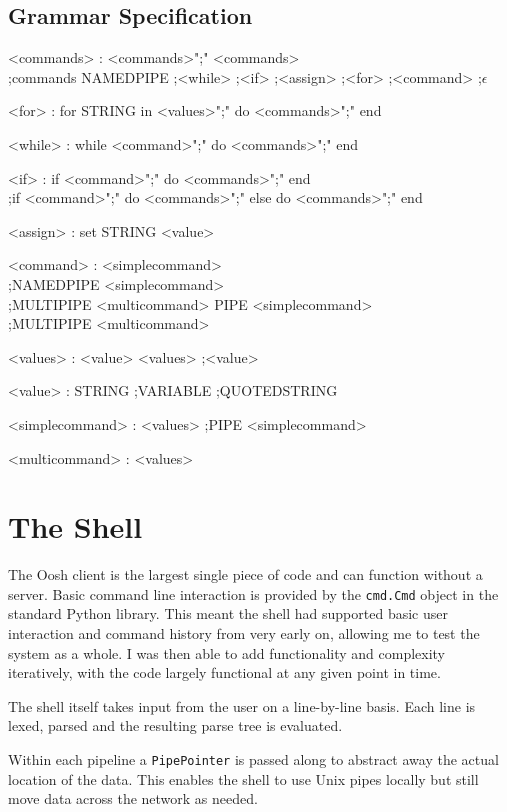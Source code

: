 \documentclass[12pt,twoside,notitlepage]{report}
\begin{document}
\subsection{Grammar Specification}
\begin{grammar}
<commands> : <commands>";" <commands>\\
;commands NAMEDPIPE
;<while>
;<if>
;<assign>
;<for>
;<command>
;$\epsilon$

<for> : for STRING in <values>";" do <commands>";" end

<while> : while <command>";" do <commands>";" end

<if> : if <command>";" do <commands>";" end\\
;if <command>";" do <commands>";" else do <commands>";" end

<assign> : set STRING <value>

<command> : <simplecommand>\\
;NAMEDPIPE <simplecommand>\\
;MULTIPIPE <multicommand> PIPE <simplecommand>\\
;MULTIPIPE <multicommand>

<values> : <value> <values>
;<value>

<value> : STRING
;VARIABLE
;QUOTEDSTRING

<simplecommand> : <values>
;PIPE <simplecommand>
    
<multicommand> : <values>
\end{grammar}

\section{The Shell}
The Oosh client is the largest single piece of code and can function without a
server. Basic command line interaction is provided by the {\tt cmd.Cmd} object
in the standard Python library. This meant the shell had supported basic user
interaction and command history from very early on, allowing me to test the
system as a whole. I was then able to add functionality and complexity
iteratively, with the code largely functional at any given point in time.

The shell itself takes input from the user on a line-by-line basis. Each line is
lexed, parsed and the resulting parse tree is evaluated.

Within each pipeline %
a {\tt PipePointer} is passed along to abstract away the actual location of the
data. This enables the shell to use Unix pipes locally %
but still move data across the network as needed.
\end{document}
